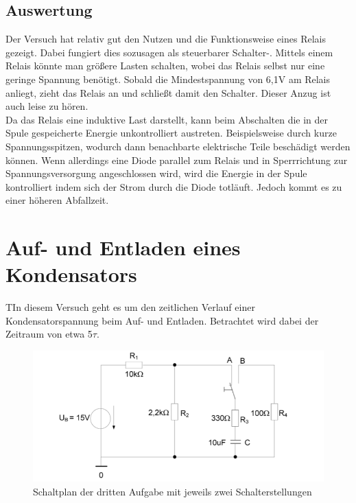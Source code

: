 \documentclass{article}
\begin{document}
\subsection{Auswertung}
Der Versuch hat relativ gut den Nutzen und die Funktionsweise eines Relais gezeigt. Dabei fungiert dies sozusagen als steuerbarer Schalter-.
Mittels einem Relais könnte man größere Lasten schalten, wobei das Relais selbst nur eine geringe Spannung benötigt. Sobald die Mindestspannung von 6,1V am Relais anliegt, zieht das Relais an und schließt damit den Schalter. Dieser Anzug ist auch leise zu hören.\\
Da das Relais eine induktive Last darstellt, kann beim Abschalten die in der Spule gespeicherte Energie unkontrolliert austreten. Beispielsweise durch kurze Spannungsspitzen, wodurch dann benachbarte elektrische Teile beschädigt werden können.
Wenn allerdings eine Diode parallel zum Relais und in Sperrrichtung zur Spannungsversorgung angeschlossen wird, wird die Energie in der Spule kontrolliert indem sich der Strom durch die Diode totläuft. 
Jedoch kommt es zu einer höheren Abfallzeit.

\newpage

\section{Auf- und Entladen eines Kondensators}
\begin{task}
TIn diesem Versuch geht es um den zeitlichen Verlauf einer Kondensatorspannung beim Auf- und Entladen. Betrachtet wird dabei der Zeitraum von etwa 5$\tau$.
\end{task}
\begin{figure}[h]
    \begin{center}
        \includegraphics{../assets/images/ET2P4/Schaltplan3.PNG}
        \caption{Schaltplan der dritten Aufgabe mit jeweils zwei Schalterstellungen}
    \end{center}
\end{figure}
\end{document}
